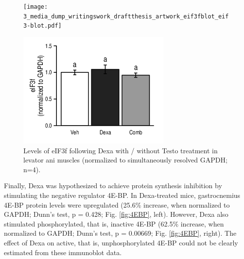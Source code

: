 \documentclass[12pt,english]{report}\usepackage[]{graphicx}\usepackage[]{color}
\newenvironment{knitrout}{}{} %
\begin{document}
\begin{figure}
\begin{minipage}[t][2in][c]{3in}%
\texttt{[image: 3\_media\_dump\_writingswork\_draftthesis\_artwork\_eif3fblot\_eif3-blot.pdf]}%
\end{minipage}%
\begin{minipage}[t][2.2in][c]{3in}%
\begin{knitrout}
\color{fgcolor}
\includegraphics[width=3in,height=2.in]{figure/eifthree-1} 

\end{knitrout}
%
\end{minipage}

\protect\caption[Levels of eIF3f following Dexa with / without Testo treatments.]{Levels of eIF3f following Dexa with / without Testo treatment in
levator ani muscles (normalized to simultaneously resolved GAPDH;
n=4)\label{fig:eif3f}.}
\end{figure}


Finally, Dexa was hypothesized to achieve protein synthesis inhibition
by stimulating the negative regulator 4E-BP. In Dexa-treated mice,
gastrocnemius 4E-BP protein levels were upregulated (25.6\%
increase, when normalized to GAPDH; Dunn's test, p = 0.428;
Fig. \ref{fig:4EBP}, left). However, Dexa also stimulated phosphorylated,
that is, inactive 4E-BP (62.5\%
increase, when normalized to GAPDH; Dunn's test, p = 0.00669;
Fig. \ref{fig:4EBP}, right). The effect of Dexa on active, that is,
unphosphorylated 4E-BP could not be clearly estimated from these immunoblot
data.
\end{document}
